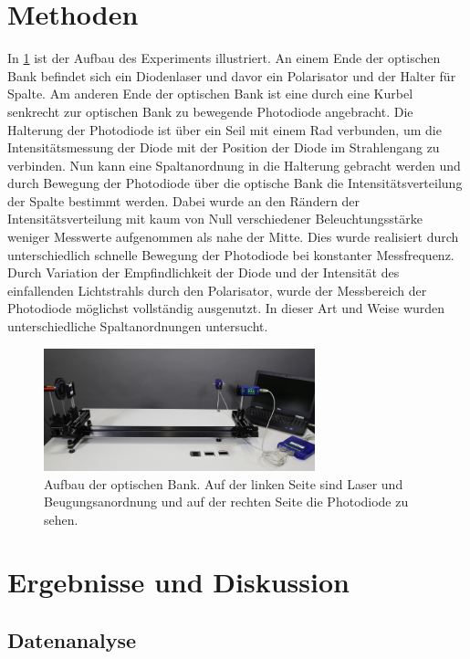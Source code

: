 \documentclass[
	a4paper,
	12pt,
	pagesize,
	ngerman
]{scrartcl}
\begin{document}
	\section{Methoden}
	In \cref{optischeBank} ist der Aufbau des Experiments illustriert.
	An einem Ende der optischen Bank befindet sich ein Diodenlaser und davor ein Polarisator und der Halter für Spalte.
	Am anderen Ende der optischen Bank ist eine durch eine Kurbel senkrecht zur optischen Bank zu bewegende Photodiode angebracht.
	Die Halterung der Photodiode ist über ein Seil mit einem Rad verbunden, um die Intensitätsmessung der Diode mit der Position der Diode im Strahlengang zu verbinden.
	Nun kann eine Spaltanordnung in die Halterung gebracht werden und durch Bewegung der Photodiode über die optische Bank die Intensitätsverteilung der Spalte bestimmt werden.
	Dabei wurde an den Rändern der Intensitätsverteilung mit kaum von Null verschiedener Beleuchtungsstärke weniger Messwerte aufgenommen als nahe der Mitte.
	Dies wurde realisiert durch unterschiedlich schnelle Bewegung der Photodiode bei konstanter Messfrequenz.
	Durch Variation der Empfindlichkeit der Diode und der Intensität des einfallenden Lichtstrahls durch den Polarisator, wurde der Messbereich der Photodiode möglichst vollständig ausgenutzt.
	In dieser Art und Weise wurden unterschiedliche Spaltanordnungen untersucht. 
	
	\begin{figure}[H]
		\includegraphics[width=0.7\textwidth]{optischeBank}
		\centering
		\caption{Aufbau der optischen Bank. Auf der linken Seite sind Laser und Beugungsanordnung und auf der rechten Seite die Photodiode zu sehen.\cite{optischeBank} }
		\label{optischeBank}
		\centering
	\end{figure} 
	
	\section{Ergebnisse und Diskussion}
	

	\subsection{Datenanalyse}
	
\end{document}
